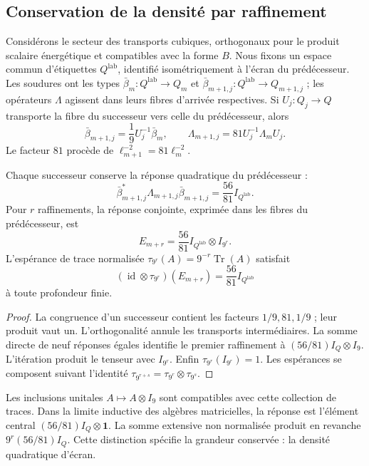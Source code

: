 \subsection{Conservation de la densité par raffinement}
\label{vii:sec:densidad-refinamiento}

Considérons le secteur des transports cubiques, orthogonaux pour le produit scalaire énergétique et compatibles avec la forme \(B\). Nous fixons un espace commun d'étiquettes \(Q^{\mathrm{lab}}\), identifié isométriquement à l'écran du prédécesseur. Les soudures ont les types \(\bar\beta_m:Q^{\mathrm{lab}}\longrightarrow Q_m\) et \(\bar\beta_{m+1,j}:Q^{\mathrm{lab}}\longrightarrow Q_{m+1,j}\) ; les opérateurs \(\Lambda\) agissent dans leurs fibres d'arrivée respectives. Si \(U_j:Q_j\longrightarrow Q\) transporte la fibre du successeur vers celle du prédécesseur, alors
\[
 \bar\beta_{m+1,j}=\frac19U_j^{-1}\bar\beta_m,\qquad
 \Lambda_{m+1,j}=81U_j^{-1}\Lambda_mU_j.
\]
Le facteur \(81\) procède de \(\ell_{m+1}^{-2}=81\ell_m^{-2}\).

\begin{theorem}
\label{vii:thm:densidad}
Chaque successeur conserve la réponse quadratique du prédécesseur :
\[
 \bar\beta_{m+1,j}^*\Lambda_{m+1,j}\bar\beta_{m+1,j}
 =\frac{56}{81}I_{Q^{\mathrm{lab}}}.
\]
Pour \(r\) raffinements, la réponse conjointe, exprimée dans les fibres du prédécesseur, est
\[
 E_{m+r}=\frac{56}{81}I_{Q^{\mathrm{lab}}}\otimes I_{9^r}.
\]
L'espérance de trace normalisée
\(\tau_{9^r}(A)=9^{-r}\operatorname{Tr}(A)\) satisfait
\[
 (\operatorname{id}\otimes\tau_{9^r})(E_{m+r})
 =\frac{56}{81}I_{Q^{\mathrm{lab}}}
\]
à toute profondeur finie.
\end{theorem}

\begin{proof}
La congruence d'un successeur contient les facteurs \(1/9,81,1/9\) ; leur produit vaut un. L'orthogonalité annule les transports intermédiaires. La somme directe de neuf réponses égales identifie le premier raffinement à \((56/81)I_Q\otimes I_9\). L'itération produit le tenseur avec \(I_{9^r}\). Enfin \(\tau_{9^r}(I_{9^r})=1\). Les espérances se composent suivant l'identité \(\tau_{9^{r+s}}=\tau_{9^r}\otimes\tau_{9^s}\).
\end{proof}

Les inclusions unitales \(A\mapsto A\otimes I_9\) sont compatibles avec cette collection de traces. Dans la limite inductive des algèbres matricielles, la réponse est l'élément central \((56/81)I_Q\otimes\mathbf1\). La somme extensive non normalisée produit en revanche \(9^r(56/81)I_Q\). Cette distinction spécifie la grandeur conservée : la densité quadratique d'écran.

